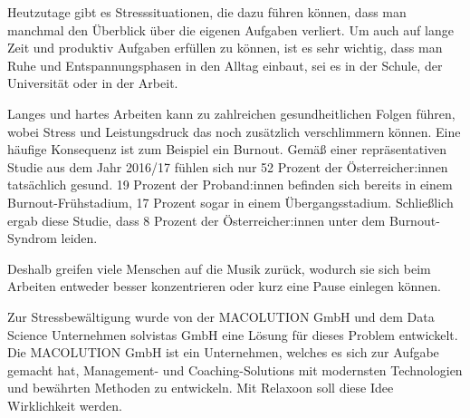 
Heutzutage gibt es Stresssituationen, die dazu führen können, dass man manchmal den Überblick über die 
eigenen Aufgaben verliert. Um auch auf lange Zeit und produktiv Aufgaben erfüllen zu können, ist es sehr 
wichtig, dass man Ruhe und Entspannungsphasen in den Alltag einbaut, sei es in der Schule, der Universität
oder in der Arbeit. 

Langes und hartes Arbeiten kann zu zahlreichen gesundheitlichen Folgen führen, wobei Stress und 
Leistungsdruck das noch zusätzlich verschlimmern können. Eine häufige Konsequenz ist zum Beispiel
ein Burnout. Gemäß einer repräsentativen Studie aus dem Jahr 2016/17 fühlen sich nur 52 Prozent der 
Österreicher:innen tatsächlich gesund. 19 Prozent der Proband:innen befinden sich bereits in einem 
Burnout-Frühstadium, 17 Prozent sogar in einem Übergangsstadium. Schließlich ergab diese Studie, dass 
8 Prozent der Österreicher:innen unter dem Burnout-Syndrom leiden. \cite{burnout}

Deshalb greifen viele Menschen
auf die Musik zurück, wodurch sie sich beim Arbeiten entweder besser konzentrieren oder kurz
eine Pause einlegen können.

Zur Stressbewältigung wurde von der MACOLUTION GmbH und dem Data Science Unternehmen solvistas GmbH
eine Lösung für dieses Problem entwickelt. 
Die MACOLUTION GmbH ist ein Unternehmen, welches es sich zur Aufgabe gemacht hat,
Management- und Coaching-Solutions mit modernsten Technologien und bewährten Methoden zu entwickeln.
\cite{MACOLUTION}
Mit Relaxoon soll diese Idee Wirklichkeit werden.

